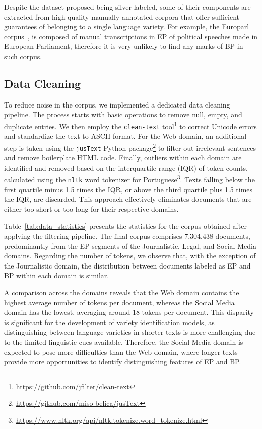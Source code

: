 Despite the dataset proposed being silver-labeled, some of their components are extracted from high-quality manually annotated corpora that offer sufficient guarantees of belonging to a single language variety. For example, the Europarl corpus~\cite{koehn2005europarl}, is composed of manual transcriptions in EP of political speeches made in European Parliament, therefore it is very unlikely to find any marks of BP in such corpus.

\subsection{Data Cleaning}

To reduce noise in the corpus, we implemented a dedicated data cleaning pipeline. The process starts with basic operations to remove null, empty, and duplicate entries. We then employ the \texttt{clean-text} tool\footnote{\url{https://github.com/jfilter/clean-text}} to correct Unicode errors and standardize the text to ASCII format. For the Web domain, an additional step is taken using the \texttt{jusText} Python package\footnote{\url{https://github.com/miso-belica/jusText}} to filter out irrelevant sentences and remove boilerplate HTML code. Finally, outliers within each domain are identified and removed based on the interquartile range (IQR) of token counts, calculated using the \texttt{nltk} word tokenizer for Portuguese\footnote{\url{https://www.nltk.org/api/nltk.tokenize.word_tokenize.html}}. Texts falling below the first quartile minus 1.5 times the IQR, or above the third quartile plus 1.5 times the IQR, are discarded. This approach effectively eliminates documents that are either too short or too long for their respective domains.

Table~\ref{tab:data_statistics} presents the statistics for the corpus obtained after applying the filtering pipeline. The final corpus comprises 7,304,438 documents, predominantly from the EP segments of the Journalistic, Legal, and Social Media domains. Regarding the number of tokens, we observe that, with the exception of the Journalistic domain, the distribution between documents labeled as EP and BP within each domain is similar.

A comparison across the domains reveals that the Web domain contains the highest average number of tokens per document, whereas the Social Media domain has the lowest, averaging around 18 tokens per document. This disparity is significant for the development of variety identification models, as distinguishing between language varieties in shorter texts is more challenging due to the limited linguistic cues available. Therefore, the Social Media domain is expected to pose more difficulties than the Web domain, where longer texts provide more opportunities to identify distinguishing features of EP and BP.

